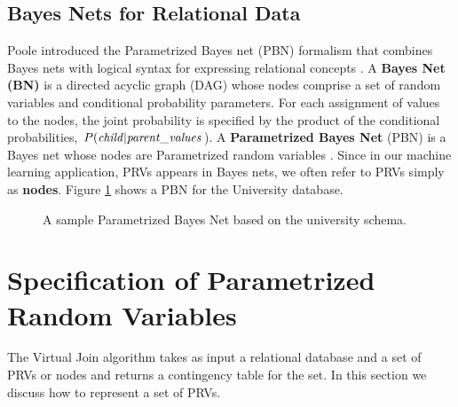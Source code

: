 \documentclass{vldb}
\begin{document}
\subsection{Bayes Nets for Relational Data}
Poole introduced the Parametrized Bayes net (PBN) formalism that combines Bayes nets with logical syntax for expressing relational concepts \cite{Poole2003}. A {\bf Bayes Net (BN)} is a directed acyclic graph (DAG) whose nodes comprise a set of random variables and conditional probability parameters.
For each assignment of values to the nodes, the joint probability 
is specified by the product of the conditional probabilities, $P(\it{child}|\it{parent\_values}$). A \textbf{Parametrized Bayes Net} (PBN) is a Bayes net whose nodes are Parametrized random variables \cite{Poole2003}. 
Since in our machine learning application, PRVs appears in Bayes nets, we often refer to PRVs simply as \textbf{nodes}. Figure \ref{fig:bn-example} shows a PBN for the University database.
\begin{figure}[htbp] %
 \centering
{}
\caption{ A sample Parametrized Bayes Net based on the university schema. 
}\label{fig:bn-example}
\end{figure}

\section{Specification of Parametrized Random Variables}
The Virtual Join algorithm takes as input a relational database and a set of PRVs or nodes and returns a contingency table for the set. In this section we discuss how to represent a set of PRVs.
\end{document}
